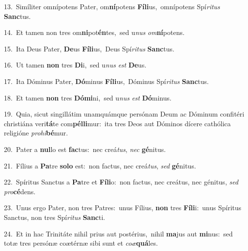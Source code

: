{\numbfont\textcolor{\numbcolor}{13.}}~Simíliter omnípotens Pater, om\-\textbf{ní}\-potens \textbf{Fí}\-\textbf{li}us,~\star omnípotens Spí\-\textit{ri}\-\textit{tus} \textbf{Sanc}\-tus.\par
{\numbfont\textcolor{\numbcolor}{14.}}~Et tamen non tres om\-\textbf{ni}\-pot\-\textbf{én}\-tes,~\star sed u\textit{nus} \textit{om}\-\textbf{ní}potens.\par
{\numbfont\textcolor{\numbcolor}{15.}}~Ita Deus Pater, \textbf{De}\-us \textbf{Fí}\-\textbf{li}us,~\star Deus Spí\-\textit{ri}\-\textit{tus} \textbf{Sanc}\-tus.\par
{\numbfont\textcolor{\numbcolor}{16.}}~Ut tamen \textbf{non} tres \textbf{Di}\-i,~\star sed u\textit{nus} \textit{est} \textbf{De}\-us.\par
{\numbfont\textcolor{\numbcolor}{17.}}~Ita Dóminus Pater, \textbf{Dó}\-minus \textbf{Fí}\-\textbf{li}us,~\star Dóminus Spí\-\textit{ri}\-\textit{tus} \textbf{Sanc}\-tus.\par
{\numbfont\textcolor{\numbcolor}{18.}}~Et tamen \textbf{non} tres \textbf{Dó}\-\textbf{mi}ni,~\star sed u\textit{nus} \textit{est} \textbf{Dó}\-minus.\par
{\numbfont\textcolor{\numbcolor}{19.}}~Quia, sicut singillátim unamquámque persónam Deum ac Dóminum confitéri christiána veri\-\textbf{tá}\-te com\-\textbf{pél}\-\textbf{li}mur:~\star ita tres Deos aut Dóminos dícere cathólica religióne \textit{pro}\-\textit{hi}\textbf{bé}mur.\par
{\numbfont\textcolor{\numbcolor}{20.}}~Pater a \textbf{nul}\-lo est \textbf{fac}\-tus:~\star nec creá\-\textit{tus}\-, \textit{nec} \textbf{gé}\-nitus.\par
{\numbfont\textcolor{\numbcolor}{21.}}~Fílius a \textbf{Pa}\-tre \textbf{so}\-\textbf{lo} est:~\star non factus, nec creá\-\textit{tus}\-, \textit{sed} \textbf{gé}\-nitus.\par
{\numbfont\textcolor{\numbcolor}{22.}}~Spíritus Sanctus a \textbf{Pa}\-tre et \textbf{Fí}\-\textbf{li}o:~\star non factus, nec creátus, nec génitus, \textit{sed} \textit{pro}\-\textbf{cé}dens.\par
{\numbfont\textcolor{\numbcolor}{23.}}~Unus ergo Pater, non tres Patres:~\dagger unus Fílius, \textbf{non} tres \textbf{Fí}\-\textbf{li}i:~\star unus Spíritus Sanctus, non tres Spí\-\textit{ri}\-\textit{tus} \textbf{Sanc}\-ti.\par
{\numbfont\textcolor{\numbcolor}{24.}}~Et in hac Trinitáte nihil prius aut postérius,~\dagger nihil \textbf{ma}\-jus aut \textbf{mi}\-nus:~\star sed totæ tres persónæ coætérnæ sibi sunt et \textit{co}\-\textit{æ}\textbf{quá}les.\par
